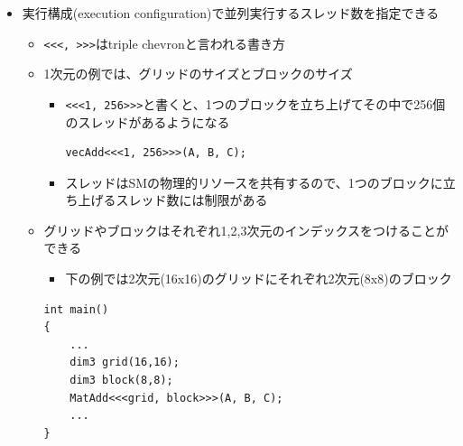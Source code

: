 \documentclass[12pt,a4paper,uplatex]{jsarticle}
\begin{document}
\begin{itemize}
\begin{lstlisting}[caption=Kernel function,label=kernelFunction]
}
  \end{lstlisting}
  \item 実行構成(execution configuration)で並列実行するスレッド数を指定できる
  \begin{itemize}
    \item \lstinline|<<<, >>>|はtriple chevronと言われる書き方
    \item 1次元の例では、グリッドのサイズとブロックのサイズ
    \begin{itemize}
      \item \lstinline|<<<1, 256>>>|と書くと、1つのブロックを立ち上げてその中で256個のスレッドがあるようになる
      \begin{lstlisting}[caption= Execution Configuration,label=kernelFunction]
vecAdd<<<1, 256>>>(A, B, C);
      \end{lstlisting}
      \item スレッドはSMの物理的リソースを共有するので、1つのブロックに立ち上げるスレッド数には制限がある
    \end{itemize}
    \item グリッドやブロックはそれぞれ1,2,3次元のインデックスをつけることができる
    \begin{itemize}
      \item 下の例では2次元(16x16)のグリッドにそれぞれ2次元(8x8)のブロック
    \end{itemize}
    \begin{lstlisting}[caption= Dimensions of Grid and Block, label=dimensionsOfGridAndBlock]
int main()
{
    ...
    dim3 grid(16,16);
    dim3 block(8,8);
    MatAdd<<<grid, block>>>(A, B, C);
    ...
}
    \end{lstlisting}


\end{itemize}
\end{itemize}
\end{document}
